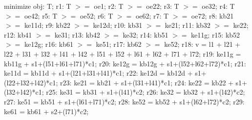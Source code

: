\documentclass[a4paper,11pt, titlepage]{article}
\begin{document}
\begin{flushleft}
minimize obj: T;\linebreak
\linebreak
r1: T $>=$ oe1;\linebreak
r2: T $>=$ oe22;\linebreak
r3: T $>=$ oe32;\linebreak
r4: T $>=$ oe42;\linebreak
r5: T $>=$ oe52;\linebreak
r6: T $>=$ oe62;\linebreak
r7: T $>=$ oe72;\linebreak 
\linebreak
r8: kb21 $>=$ ke11d;\linebreak
r9: kb22 $>=$ ke12d;\linebreak
r10: kb31 $>=$ ke21;\linebreak
r11: kb32 $>=$ ke22;\linebreak
r12: kb41 $>=$ ke31;\linebreak
r13: kb42 $>=$ ke32;\linebreak
r14: kb51 $>=$ ke11g;\linebreak
r15: kb52 $>=$ ke12g;\linebreak
r16: kb61 $>=$ ke51;\linebreak
r17: kb62 $>=$ ke52;\linebreak
\linebreak
r18: v = l1 + l21 + l22 + l31 + l32 + l41 + l42 + l51 + l52 + l61 + l62 + l71 + l72;\linebreak
\linebreak
r19: ke11g = kb11g + s1+(l51+l61+l71)*c1;\linebreak
r20: ke12g = kb12g + s1+(l52+l62+l72)*c1;\linebreak
r21: ke11d = kb11d + s1+(l21+l31+l41)*c1;\linebreak
r22: ke12d = kb12d + s1+(l22+l32+l42)*c1;\linebreak
r23: ke21 = kb21 + s1+(l31+l41)*c1;\linebreak
r24: ke22 = kb22 + s1+(l32+l42)*c1;\linebreak
r25: ke31 = kb31 + s1+(l41)*c2;\linebreak
r26: ke32 = kb32 + s1+(l42)*c2;\linebreak
r27: ke51 = kb51 + s1+(l61+l71)*c2;\linebreak
r28: ke52 = kb52 + s1+(l62+l72)*c2;\linebreak
r29: ke61 = kb61 + s2+(l71)*c2;\linebreak

\end{flushleft}
\end{document}
